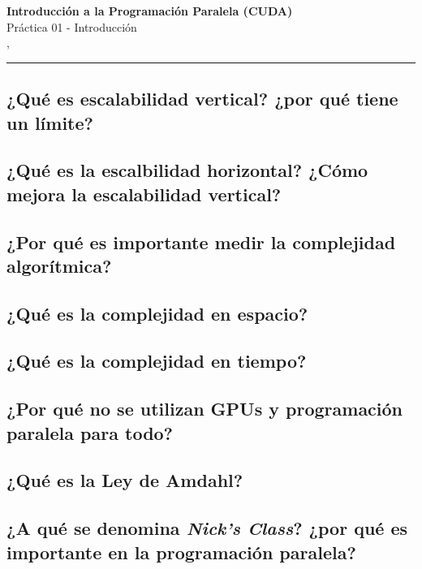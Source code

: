 



\begin{center}
  \LARGE\textbf{Introducción a la Programación Paralela (CUDA)} \\
  \Large{Práctica 01 - Introducción} \\
  \normalsize{\currentsemester, \currentyear} \\
  \vspace{1em}
  \hrule
\end{center}

\setcounter{section}{1}



\newpage

\tableofcontents

\newpage

\subsection{¿Qué es escalabilidad vertical? ¿por qué tiene un límite?}

\subsection{¿Qué es la escalbilidad horizontal? ¿Cómo mejora la escalabilidad vertical?}

\subsection{¿Por qué es importante medir la complejidad algorítmica?}

\subsection{¿Qué es la complejidad en espacio?}

\subsection{¿Qué es la complejidad en tiempo?}

\subsection{¿Por qué no se utilizan GPUs y programación paralela para todo?}

\subsection{¿Qué es la Ley de Amdahl?}

\subsection{¿A qué se denomina \textit{Nick's Class}? ¿por qué es importante en la programación paralela?}




